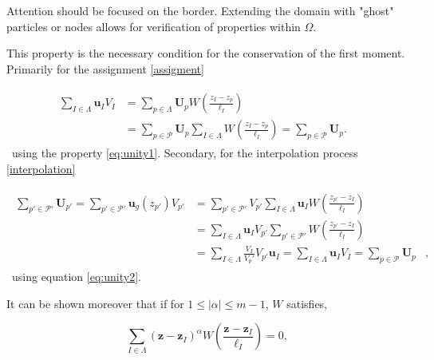 Attention should be focused on the border. Extending the domain with "ghost" particles or nodes allows for verification of properties within $\Omega$.

This property is the necessary condition for the conservation of the first moment. Primarily for the assignment \ref{assigment}

\begin{gather}
    \begin{align*}
        \sum_{I \in \Lambda} \bm u_I V_I & = \sum_{p \in \Lambda} \bm U_p  W \left(\frac{z_I - z_p}{\ell_I} \right)                                                           & \\
                                         & = \sum_{p \in \mathcal P} \bm U_p \sum_{I \in \Lambda} W \left(\frac{z_I - z_p}{\ell_I} \right) = \sum_{p \in \mathcal P} \bm U_p. &
    \end{align*}
\end{gather}~using the property \eqref{eq:unity1}. Secondary, for the interpolation process \ref{interpolation}

\begin{gather}
    \begin{align*}
        \sum_{p' \in \mathcal P'} \bm U_{p'} = \sum_{p' \in \mathcal P'} \bm u_g(z_{p'}) V_{p'} & = \sum_{p' \in \mathcal P'} V_{p'} \sum_{I \in \Lambda} \bm u_I W \left(\frac{z_{p'} - z_I}{\ell_I}\right)                                                &   \\
                                                                                                & =  \sum_{I \in \Lambda} \bm u_I  V_{p'}\sum_{p' \in \mathcal P'} W \left(\frac{z_{p'} - z_I}{\ell_I}\right)                                               &   \\
                                                                                                & =  \sum_{I \in \Lambda} \frac{V_I}{V_p'} V_{p'} \bm u_I =                            \sum_{I \in \Lambda} \bm u_I V_{I} = \sum_{p \in \mathcal P} \bm U_p & ,
    \end{align*}
\end{gather}~using equation \eqref{eq:unity2}.

It can be shown moreover that if for $1 \leq |\alpha| \leq m - 1$, $W$ satisfies,

\begin{equation}
    \sum_{I \in \Lambda} {(\bm z-\bm z_I)}^\alpha W \left(\frac{\bm z - \bm z_I}{\ell_I} \right) = 0, \label{eq:momentProperty}
\end{equation}

